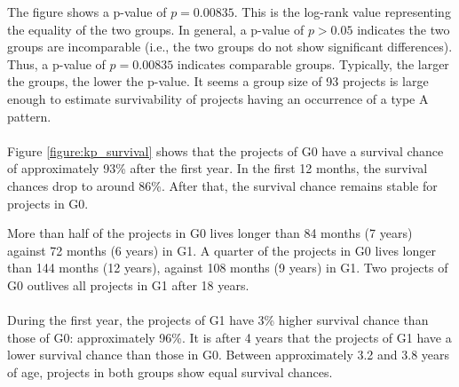 The figure shows a p-value of $p = 0.00835$. This is the log-rank value
representing the equality of the two groups. In general, a p-value of $p >
0.05$ indicates the two groups are incomparable (i.e., the two groups do not
show significant differences). Thus, a p-value of $p = 0.00835$ indicates
comparable groups. Typically, the larger the groups, the lower the p-value.
It seems a group size of 93 projects is large enough to estimate survivability
of projects having an occurrence of a type A pattern.

\paragraph{}
Figure \ref{figure:kp_survival} shows that the projects of G0 have a survival
chance of approximately 93\% after the first year. In the first 12 months, the
survival chances drop to around 86\%. After that, the survival chance remains
stable for projects in G0.

More than half of the projects in G0 lives longer than 84 months (7 years)
against 72 months (6 years) in G1. A quarter of the projects in G0 lives longer
than 144 months (12 years), against 108 months (9 years) in G1. Two projects of
G0 outlives all projects in G1 after 18 years.

\paragraph{}
During the first year, the projects of G1 have 3\% higher survival chance than
those of G0: approximately 96\%. It is after 4 years that the projects of G1
have a lower survival chance than those in G0. Between approximately 3.2 and
3.8 years of age, projects in both groups show equal survival chances.

\begin{comment}
- Factual results
- Tables and figures for clarification

This chapter presents and clarifies the results obtained during the research.
The focus should be on the factual results, not the interpretation or
discussion. Tables and graphics should be used to increase the clarity of the
results where applicable.
Have a look at the the results chapter in this example thesis on Paul’s
homepage\footnote{http://homepages.cwi.nl/~paulk/thesesMasterSoftwareEngineering/2006/ArnoldLankamp.pdf}.
\end{comment}
